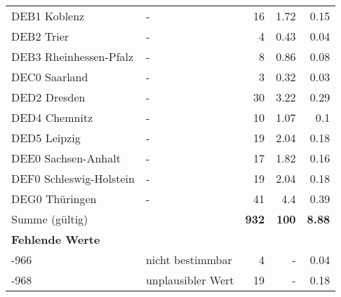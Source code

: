\begin{longtable}{Xlrrr}
        \multicolumn{1}{X}{DEB1 Koblenz} & - & \num{16} & \num[round-mode=places,round-precision=2]{1.72} & \num[round-mode=places,round-precision=2]{0.15} \\
        \multicolumn{1}{X}{DEB2 Trier} & - & \num{4} & \num[round-mode=places,round-precision=2]{0.43} & \num[round-mode=places,round-precision=2]{0.04} \\
        \multicolumn{1}{X}{DEB3 Rheinhessen-Pfalz} & - & \num{8} & \num[round-mode=places,round-precision=2]{0.86} & \num[round-mode=places,round-precision=2]{0.08} \\
        \multicolumn{1}{X}{DEC0 Saarland} & - & \num{3} & \num[round-mode=places,round-precision=2]{0.32} & \num[round-mode=places,round-precision=2]{0.03} \\
        \multicolumn{1}{X}{DED2 Dresden} & - & \num{30} & \num[round-mode=places,round-precision=2]{3.22} & \num[round-mode=places,round-precision=2]{0.29} \\
        \multicolumn{1}{X}{DED4 Chemnitz} & - & \num{10} & \num[round-mode=places,round-precision=2]{1.07} & \num[round-mode=places,round-precision=2]{0.1} \\
        \multicolumn{1}{X}{DED5 Leipzig} & - & \num{19} & \num[round-mode=places,round-precision=2]{2.04} & \num[round-mode=places,round-precision=2]{0.18} \\
        \multicolumn{1}{X}{DEE0 Sachsen-Anhalt} & - & \num{17} & \num[round-mode=places,round-precision=2]{1.82} & \num[round-mode=places,round-precision=2]{0.16} \\
        \multicolumn{1}{X}{DEF0 Schleswig-Holstein} & - & \num{19} & \num[round-mode=places,round-precision=2]{2.04} & \num[round-mode=places,round-precision=2]{0.18} \\
        \multicolumn{1}{X}{DEG0 Thüringen} & - & \num{41} & \num[round-mode=places,round-precision=2]{4.4} & \num[round-mode=places,round-precision=2]{0.39} \\
     \midrule
      \multicolumn{2}{l}{Summe (gültig)} & \textbf{\num{932}} &
      \textbf{\num{100}} &
         \textbf{\num[round-mode=places,round-precision=2]{8.88}} \\
     \multicolumn{5}{l}{\textbf{Fehlende Werte}}\\
       -966 & nicht bestimmbar & \num{4} & - & \num[round-mode=places,round-precision=2]{0.04} \\

       -968 & unplausibler Wert & \num{19} & - & \num[round-mode=places,round-precision=2]{0.18} \\


\end{longtable}
